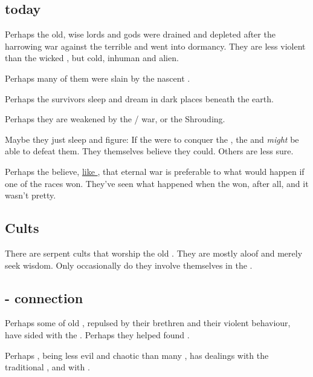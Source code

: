 \subsection{\Ophidians{} today}
\label{Ophidians today}
Perhaps the old, wise \ophidian{} lords and gods were drained and depleted after the harrowing war against the terrible \thzantzais{} and went into dormancy. They are less violent than the wicked \draecchonosh, but cold, inhuman and alien. 

Perhaps many of them were slain by the nascent \draecchonosh. 

Perhaps the survivors sleep and dream in dark places beneath the earth. 

Perhaps they are weakened by the \dragon/\bane{} war, or the Shrouding. 

Maybe they just sleep and figure:  If the \banes{} were to conquer the \dragons, the \ophidians{} and \vlekkeshsala{} \emph{might} be able to defeat them. They themselves believe they could. Others are less sure. 

Perhaps the \ophidians{} believe, \hyperref[Ishnaruchaefir chooses eternal war]{like \Ishnaruchaefir}, that eternal war is preferable to what would happen if one of the races won. They've seen what happened when the \draecchonosh{} won, after all, and it wasn't pretty. 







\subsection{Cults}
There are serpent cults that worship the old \ophidians. They are mostly aloof and merely seek wisdom. Only occasionally do they involve themselves in the \feud. 







\subsection{\Ophidian-\resphan{} connection}
Perhaps some of old \ophidians, repulsed by their \draconic{} brethren and their violent behaviour, have sided with the \resphain. Perhaps they helped found \Mystraacht. 

Perhaps \Ishna, being less evil and chaotic than many \dragons, has dealings with the traditional \ophidians{}, and with \Mystraacht. 















